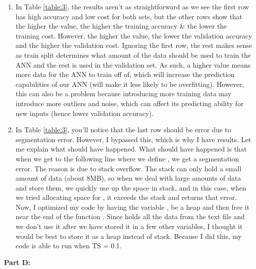 \documentclass[12pt]{article}
\begin{document}
\begin{enumerate}
    \item In Table \ref{table:3}, the results aren't as straightforward as we see the first row has high accuracy and low cost for both sets, but the other rows show that the higher the value, the higher the training accuracy \& the lower the training cost. However, the higher the value, the lower the validation accuracy and the higher the validation cost. Ignoring the first row, the rest makes sense as train split determines what amount of the data should be used to train the ANN and the rest is used in the validation set. As such, a higher value means more data for the ANN to train off of, which will increase the prediction capabilities of our ANN (will make it less likely to be overfitting). However, this can also be a problem because introducing more training data may introduce more outliers and noise, which can affect its predicting ability for new inputs (hence lower validation accuracy).
    \item In Table \ref{table:3}, you'll notice that the last row should be error due to segmentation error. However, I bypassed this, which is why I have results. Let me explain what should have happened. What should have happened is that when we get to the following line where we define
    , we get a segmentation error. The reason is due to stack overflow. The stack can only hold a small amount of data (about 8MB), so when we deal with large amounts of data and store them, we quickly use up the space in stack, and in this case, when we tried allocating space for
    , it exceeds the stack and returns that error. Now, I optimized my code by having the variable , be a heap and then free it near the end of the function . Since  holds all the data from the text file and we don't use it after we have stored it in a few other variables, I thought it would be best to store it as a heap instead of stack. Because I did this, my code is able to run when TS = 0.1.
\end{enumerate}
\vspace{\baselineskip}
\vspace{\baselineskip}
\vspace{\baselineskip}
\vspace{\baselineskip}
\vspace{\baselineskip}
\vspace{\baselineskip}
{\fontsize{15}{14}\selectfont\textcolor{BurntOrange}{\textbf{Part D:}}}
\vspace{\baselineskip}
\vspace{\baselineskip}
\end{document}
